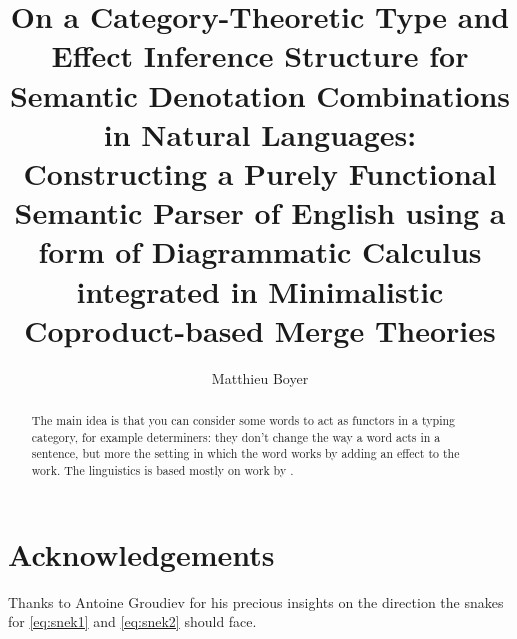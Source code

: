 \documentclass[math, english, info]{tcart}
\title{On a Category-Theoretic Type and Effect Inference Structure for Semantic Denotation Combinations in Natural Languages:\\ Constructing a Purely Functional Semantic Parser of English using a form of Diagrammatic Calculus integrated in Minimalistic Coproduct-based Merge Theories}
\author{Matthieu Boyer}
\begin{document}
\maketitle
\tableofcontents

\begin{abstract}
	The main idea is that you can consider some words to act as functors in a typing category, for example determiners:
	they don't change the way a word acts in a sentence,
	but more the setting in which the word works by adding an effect to the work.
	The linguistics is based mostly on work by .
\end{abstract}










\section*{Acknowledgements}
Thanks to Antoine Groudiev for his precious insights on the direction the snakes for \eqref{eq:snek1} and \eqref{eq:snek2} should face.

\clearpage
\appendix








\end{document}
